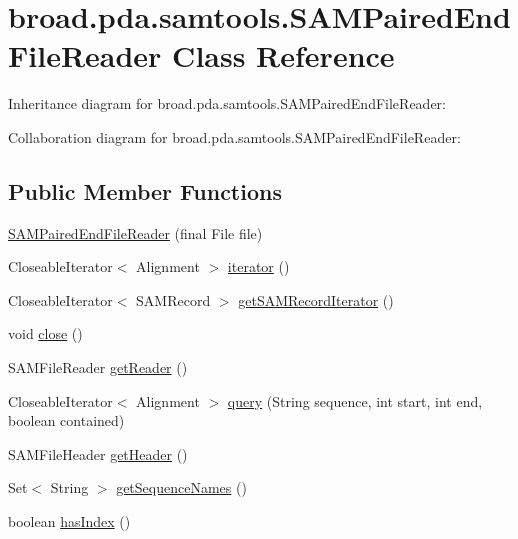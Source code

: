 \hypertarget{classbroad_1_1pda_1_1samtools_1_1_s_a_m_paired_end_file_reader}{\section{broad.\+pda.\+samtools.\+S\+A\+M\+Paired\+End\+File\+Reader Class Reference}
\label{classbroad_1_1pda_1_1samtools_1_1_s_a_m_paired_end_file_reader}
}


Inheritance diagram for broad.\+pda.\+samtools.\+S\+A\+M\+Paired\+End\+File\+Reader\+:


Collaboration diagram for broad.\+pda.\+samtools.\+S\+A\+M\+Paired\+End\+File\+Reader\+:
\subsection*{Public Member Functions}
\begin{DoxyCompactItemize}
\item 
\hyperlink{classbroad_1_1pda_1_1samtools_1_1_s_a_m_paired_end_file_reader_aceab6b49722b6ea070e0e89dcc6e729f}{S\+A\+M\+Paired\+End\+File\+Reader} (final File file)
\item 
Closeable\+Iterator$<$ Alignment $>$ \hyperlink{classbroad_1_1pda_1_1samtools_1_1_s_a_m_paired_end_file_reader_ac5a42e248431b503fb9e03126fb688ef}{iterator} ()
\item 
Closeable\+Iterator$<$ S\+A\+M\+Record $>$ \hyperlink{classbroad_1_1pda_1_1samtools_1_1_s_a_m_paired_end_file_reader_a445a2860d8414157045797d3a79fd057}{get\+S\+A\+M\+Record\+Iterator} ()
\item 
void \hyperlink{classbroad_1_1pda_1_1samtools_1_1_s_a_m_paired_end_file_reader_a39580aacae64bebfdad06b166388c554}{close} ()
\item 
S\+A\+M\+File\+Reader \hyperlink{classbroad_1_1pda_1_1samtools_1_1_s_a_m_paired_end_file_reader_ab3636dbaeb6c8f851d60084603b30907}{get\+Reader} ()
\item 
Closeable\+Iterator$<$ Alignment $>$ \hyperlink{classbroad_1_1pda_1_1samtools_1_1_s_a_m_paired_end_file_reader_ab533cac8d250a0054bca6f862830cd52}{query} (String sequence, int start, int end, boolean contained)
\item 
S\+A\+M\+File\+Header \hyperlink{classbroad_1_1pda_1_1samtools_1_1_s_a_m_paired_end_file_reader_aebc7516a7202903377c4e58b0b75ed33}{get\+Header} ()
\item 
Set$<$ String $>$ \hyperlink{classbroad_1_1pda_1_1samtools_1_1_s_a_m_paired_end_file_reader_a1412dc9e8408dcbc581ca071488e53b5}{get\+Sequence\+Names} ()
\item 
boolean \hyperlink{classbroad_1_1pda_1_1samtools_1_1_s_a_m_paired_end_file_reader_afbc47f2e30cc5e2de8b42450005f521f}{has\+Index} ()
\end{DoxyCompactItemize}
